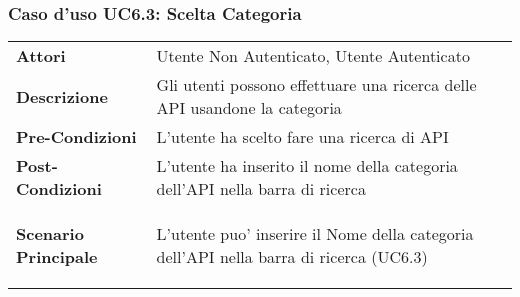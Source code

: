 \subsubsection{Caso d'uso UC6.3:  Scelta Categoria}
\label{UC6_3}

\begin{tabular}{ l | p{11cm}}
	\hline
	\rowcolor{Gray}
	 \multicolumn{2}{c}{UC6.3 - Scelta Categoria} \\
	 \hline
	\textbf{Attori} & Utente Non Autenticato, Utente Autenticato \\
	\textbf{Descrizione} & Gli utenti possono effettuare una ricerca delle API usandone la categoria\\
	\textbf{Pre-Condizioni} & L'utente ha scelto fare una ricerca di API\\
	\textbf{Post-Condizioni} & L'utente ha inserito il nome della categoria dell'API nella barra di ricerca \\
	\textbf{Scenario Principale} & 
	\begin{enumerate*}[label=(\arabic*.),itemjoin={\newline}]
		\item L'utente puo' inserire il Nome della categoria dell'API nella barra di ricerca (UC6.3)
	\end{enumerate*}\\
\end{tabular}